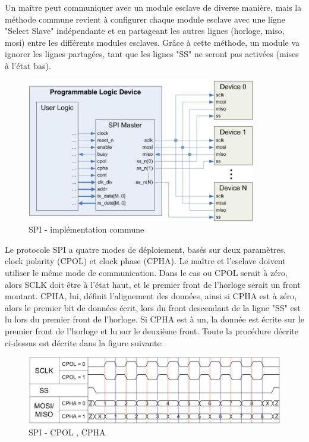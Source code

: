 \documentclass[french,a4paper,12pt]{report}
\begin{document}
			Un maître peut communiquer avec un module esclave de diverse manière, mais la méthode commune revient à configurer chaque module esclave avec une ligne "Select Slave" indépendante et en partageant les autres lignes (horloge, miso, mosi) entre les différents modules esclaves. Grâce à cette méthode, un module va ignorer les lignes partagées, tant que les lignes "SS" ne seront pas activées (mises à l'état bas).
			
	\begin{figure}[!ht]
    \center
  	\includegraphics[width=10cm]{spi_master_block.JPG}
    \caption{SPI - implémentation commune}
	\end{figure}
	
	Le protocole SPI a quatre modes de déploiement, basés sur deux paramètres, clock polarity (CPOL) et clock phase (CPHA). Le maître et l'esclave doivent utiliser le même mode de communication. 
	Dans le cas ou CPOL serait à zéro, alors SCLK doit être à l'état haut, et le premier front de l'horloge serait un front montant.
	CPHA, lui, définit l'alignement des données, ainsi si CPHA est à zéro, alors le premier bit de données écrit, lors du front descendant de la ligne "SS" est lu lors du premier front de l'horloge. Si CPHA est à un, la donnée est écrite sur le premier front de l'horloge et lu sur le deuxième front.
	Toute la procédure décrite ci-dessus est décrite dans la figure suivante:
	
	\begin{figure}[!ht]
    \center
  	\includegraphics[width=12cm]{spi_timing_diagram.JPG}
    \caption{SPI - CPOL , CPHA}
	\end{figure}
	
\end{document}
